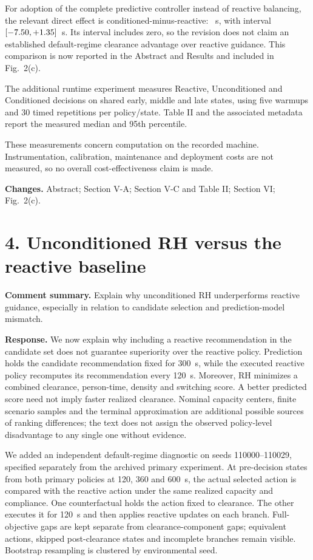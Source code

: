 \documentclass[11pt]{article}
\begin{document}
For adoption of the complete predictive controller instead of reactive balancing, the relevant direct effect is conditioned-minus-reactive: \SystemDiff~s, with interval $[-7.50,+1.35]$~s. Its interval includes zero, so the revision does not claim an established default-regime clearance advantage over reactive guidance. This comparison is now reported in the Abstract and Results and included in Fig.~2(c).

The additional runtime experiment measures Reactive, Unconditioned and Conditioned decisions on shared early, middle and late states, using five warmups and 30 timed repetitions per policy/state. Table II and the associated metadata report the measured median and 95th percentile. \RuntimeResultsText

These measurements concern computation on the recorded machine. Instrumentation, calibration, maintenance and deployment costs are not measured, so no overall cost-effectiveness claim is made.

\textbf{Changes.} Abstract; Section V-A; Section V-C and Table II; Section VI; Fig.~2(c).

\section*{4. Unconditioned RH versus the reactive baseline}
\textbf{Comment summary.} Explain why unconditioned RH underperforms reactive guidance, especially in relation to candidate selection and prediction-model mismatch.

\textbf{Response.} We now explain why including a reactive recommendation in the candidate set does not guarantee superiority over the reactive policy. Prediction holds the candidate recommendation fixed for 300~s, while the executed reactive policy recomputes its recommendation every 120~s. Moreover, RH minimizes a combined clearance, person-time, density and switching score. A better predicted score need not imply faster realized clearance. Nominal capacity centers, finite scenario samples and the terminal approximation are additional possible sources of ranking differences; the text does not assign the observed policy-level disadvantage to any single one without evidence.

We added an independent default-regime diagnostic on seeds 110000--110029, specified separately from the archived primary experiment. At pre-decision states from both primary policies at 120, 360 and 600~s, the actual selected action is compared with the reactive action under the same realized capacity and compliance. One counterfactual holds the action fixed to clearance. The other executes it for 120~s and then applies reactive updates on each branch. Full-objective gaps are kept separate from clearance-component gaps; equivalent actions, skipped post-clearance states and incomplete branches remain visible. Bootstrap resampling is clustered by environmental seed.
\end{document}
